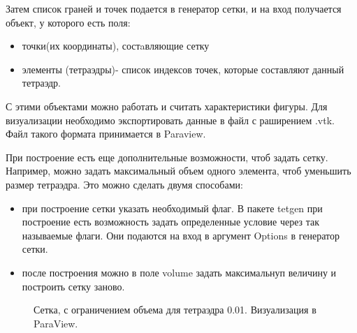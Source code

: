 Затем список граней и точек подается в генератор сетки, и на вход получается объект, у которого есть поля:
\begin{itemize}
\item точки(их координаты), состaвляющие сетку
\item элементы (тетраэдры)- список индексов точек, которые составляют данный тетраэдр.
\end{itemize}
 
 С этими объектами можно работать и считать характеристики фигуры. Для
 визуализации необходимо экспортировать данные в файл с раширением .vtk. Файл такого формата принимается в Paraview. 
 
При построение есть еще дополнительные возможности, чтоб задать сетку. Например, можно задать максимальный объем одного элемента, чтоб уменьшить размер тетраэдра. Это можно сделать двумя способами:
\begin{itemize}
    \item при построение сетки указать необходимый флаг. В пакете tetgen при построение есть возможность задать определенные условие через так называемые флаги. Они подаются на вход в аргумент Options в генератор сетки\cite{meshpy}.
    \item после построения можно в поле volume задать максимальнуп величину и построить сетку заново.
\end{itemize}
\begin{figure}[H]
 	\caption{Сетка, с ограничением объема для тетраэдра 0.01. Визуализация в ParaView.}
 	\label{fig:prism}
\end{figure}

